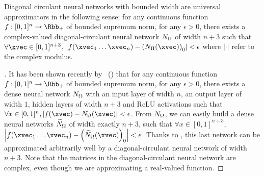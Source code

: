 

\begin{maincorollary}
  \label{corollary:ch4-universal_approximation}
  Diagonal circulant neural networks with bounded width are universal approximators in the following sense:
  for any continuous function $f:[0,1]^n \rightarrow \Rbb_+$ of bounded supremum norm, for any $\epsilon > 0$, there exists a complex-valued diagonal-circulant neural network $N_\Pi$ of width $n+3$ such that $\forall \xvec \in [0,1]^{n+3}$, $\left| f(\xvec_{1} \ldots \xvec_{n}) - \left( \nn_\Pi \left( \xvec \right) \right)_0 \right| < \epsilon$ where $|\cdot|$ refer to the complex modulus. 
\end{maincorollary}


\begin{proof}[]
  It has been shown recently by~\citet{hanin2017universal} () that for any continuous function $f:[0,1]^{n} \rightarrow \Rbb_+$ of bounded supremum norm, for any $\epsilon > 0$, there exists a dense neural network $N_\Omega$ with an input layer of width $n$, an output layer of width $1$, hidden layers of width $n+3$ and ReLU activations such that $\forall x \in [0,1]^n, \left| f(\xvec) - \nn_\Omega (\xvec) \right| < \epsilon$.
From $N_\Omega$, we can easily build a dense neural networks $\widetilde{N}_\Omega$ of width exactly $n+3$, such that $\forall x \in [0,1]^{n+3}$, $\left| f(\xvec_{1} \ldots \xvec_{n}) - \left(\widetilde{\nn}_\Omega (\xvec) \right)_{0}\right| < \epsilon$.
Thanks to , this last network can be approximated arbitrarily well by a diagonal-circulant neural network of width $n+3$.
Note that the matrices in the diagonal-circulant neural network are complex, even though we are approximating a real-valued function.
\end{proof}

